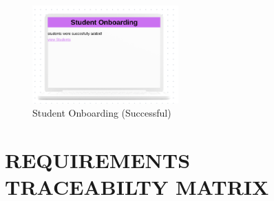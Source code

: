 \documentclass[letterpaper,12pt,oneside,listof=totoc]{scrreprt}
\begin{document}
\begin{figure}[htbp]
  \centering
  \includegraphics[width=0.5\textwidth]{Student_onboarding(succesful).png}
  \caption{Student Onboarding (Successful)}
\end{figure}



\chapter{REQUIREMENTS TRACEABILTY MATRIX}
\end{document}
